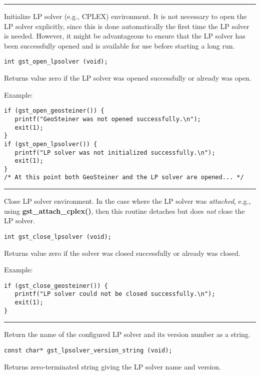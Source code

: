 \hrule
\vskip 0.25in
Initialize LP solver (e.g., CPLEX) environment. It is not necessary to
open the LP solver explicitly, since this is done automatically the
first time the LP solver is needed. However, it might be advantageous to
ensure that the LP solver has been successfully opened and is available
for use before starting a long run.

\begin{verbatim}
int gst_open_lpsolver (void);

\end{verbatim}
Returns value zero if the LP solver was opened successfully or already
was open.

\bigskip{}Example:
{\footnotesize
\begin{verbatim}
if (gst_open_geosteiner()) {
   printf("GeoSteiner was not opened successfully.\n");
   exit(1);
}
if (gst_open_lpsolver()) {
   printf("LP solver was not initialized successfully.\n");
   exit(1);
}
/* At this point both GeoSteiner and the LP solver are opened... */
\end{verbatim}
}
\clearpage{}
\label{gst_close_lpsolver}

\hrule
\vskip 0.25in
Close LP solver environment. In the case where the LP solver was
{\em attached}, e.g., using {\bf gst\_attach\_cplex()}, then this
routine detaches but does {\em not} close the LP solver.

\begin{verbatim}
int gst_close_lpsolver (void);

\end{verbatim}
Returns value zero if the solver was closed successfully or already
was closed. 

\bigskip{}Example:
{\footnotesize
\begin{verbatim}
if (gst_close_geosteiner()) {
   printf("LP solver could not be closed successfully.\n");
   exit(1);
}
\end{verbatim}
}
\clearpage{}
\label{gst_lpsolver_version_string}

\hrule
\vskip 0.25in
Return the name of the configured LP solver and its version number as a
string.

\begin{verbatim}
const char* gst_lpsolver_version_string (void);

\end{verbatim}
Returns zero-terminated string giving the LP solver name and version.

